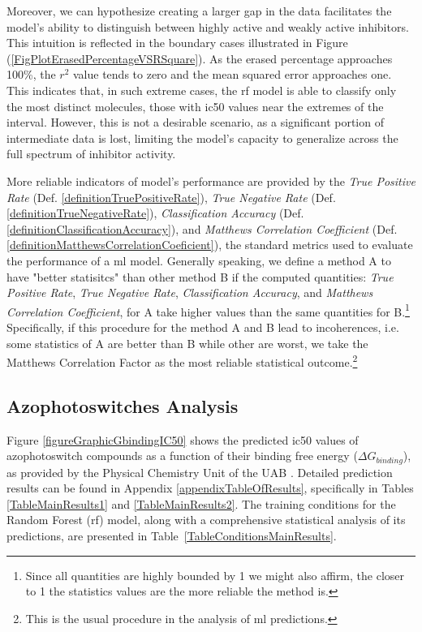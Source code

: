 \documentclass[11pt]{article}
\begin{document}
Moreover, we can hypothesize creating a larger gap in the data facilitates the model’s ability to distinguish between highly active and weakly active inhibitors. This intuition is reflected in the boundary cases illustrated in Figure (\ref{FigPlotErasedPercentageVSRSquare}). As the erased percentage approaches 100\%, the $r^2$ value tends to zero and the mean squared error approaches one. This indicates that, in such extreme cases, the \gls{rf} model is able to classify only the most distinct molecules, those with \gls{ic50} values near the extremes of the interval. However, this is not a desirable scenario, as a significant portion of intermediate data is lost, limiting the model’s capacity to generalize across the full spectrum of inhibitor activity.

More reliable indicators of model's performance are provided by the \emph{True Positive Rate} (Def. \ref{definitionTruePositiveRate}), \emph{True Negative Rate} (Def. \ref{definitionTrueNegativeRate}), \emph{Classification Accuracy} (Def. \ref{definitionClassificationAccuracy}), and \emph{Matthews Correlation Coefficient} (Def. \ref{definitionMatthewsCorrelationCoeficient}), the standard metrics used to evaluate the performance of a \gls{ml} model. Generally speaking, we define a method A to have "better statisitcs" than other method B if the computed quantities: \emph{True Positive Rate}, \emph{True Negative Rate}, \emph{Classification Accuracy}, and \emph{Matthews Correlation Coefficient}, for A take higher values than the same quantities for B.\footnote{Since all quantities are highly bounded by 1 we might also affirm, the closer to 1 the statistics values are the more reliable the method is.} Specifically, if this procedure for the method A and B lead to incoherences, i.e. some statistics of A are better than B while other are worst, we take the Matthews Correlation Factor as the most reliable statistical outcome.\footnote{This is the usual procedure in the analysis of \gls{ml} predictions\cite{MachineLearningPaper5Lipoxygenase}.}

\subsection{Azophotoswitches Analysis}

Figure \ref{figureGraphicGbindingIC50} shows the predicted \gls{ic50} values of azophotoswitch compounds as a function of their binding free energy ($\Delta G_{binding}$), as provided by the Physical Chemistry Unit of the UAB \cite{UAB_ComputationalChemistry}. Detailed prediction results can be found in Appendix \ref{appendixTableOfResults}, specifically in Tables \ref{TableMainResults1} and \ref{TableMainResults2}. The training conditions for the Random Forest (\gls{rf}) model, along with a comprehensive statistical analysis of its predictions, are presented in Table~\ref{TableConditionsMainResults}.
\end{document}
